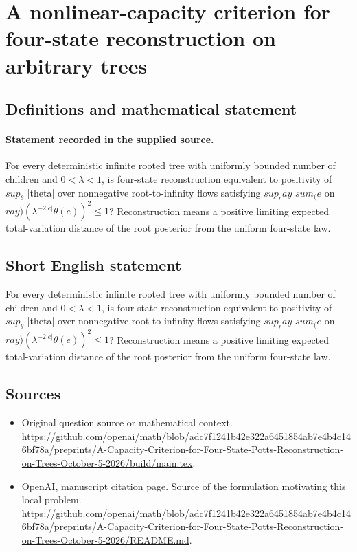 \documentclass[11pt]{article}
\begin{document}
\section*{A nonlinear-capacity criterion for four-state reconstruction on arbitrary trees}\label{statement}
\subsection{Definitions and mathematical statement}
\paragraph{Statement recorded in the supplied source.}
For every deterministic infinite rooted tree with uniformly bounded number of children and $0<\lambda <1$, is four-state reconstruction equivalent to positivity of $sup_\theta $ |theta| over nonnegative root-to-infinity flows satisfying $sup_ray$ $sum_(e$ on $ray)(\lambda ^{-2|e|}\theta (e))^2\leq 1$? Reconstruction means a positive limiting expected total-variation distance of the root posterior from the uniform four-state law.
\subsection{Short English statement}
For every deterministic infinite rooted tree with uniformly bounded number of children and $0<\lambda <1$, is four-state reconstruction equivalent to positivity of $sup_\theta $ |theta| over nonnegative root-to-infinity flows satisfying $sup_ray$ $sum_(e$ on $ray)(\lambda ^{-2|e|}\theta (e))^2\leq 1$? Reconstruction means a positive limiting expected total-variation distance of the root posterior from the uniform four-state law.
\subsection{Sources}
\begin{itemize}
\item[S1] Original question source or mathematical context.
\url{https://github.com/openai/math/blob/adc7f1241b42e322a6451854ab7e4b4c146bf78a/preprints/A-Capacity-Criterion-for-Four-State-Potts-Reconstruction-on-Trees-October-5-2026/build/main.tex}.
\item[S2] OpenAI, manuscript citation page. Source of the formulation motivating this local problem.
\url{https://github.com/openai/math/blob/adc7f1241b42e322a6451854ab7e4b4c146bf78a/preprints/A-Capacity-Criterion-for-Four-State-Potts-Reconstruction-on-Trees-October-5-2026/README.md}.
\end{itemize}
\end{document}
